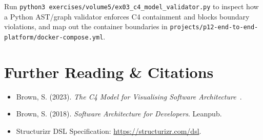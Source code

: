 \begin{labbridgebox}
Run \texttt{python3 exercises/volume5/ex03\_c4\_model\_validator.py} to inspect how a Python AST/graph validator enforces C4 containment and blocks boundary violations, and map out the container boundaries in \texttt{projects/p12-end-to-end-platform/docker-compose.yml}.
\end{labbridgebox}

\section{Further Reading \protect\& Citations}
\begin{itemize}[leftmargin=18pt]
  \item Brown, S. (2023). \textit{The C4 Model for Visualising Software Architecture}~\cite{c4model}.
  \item Brown, S. (2018). \textit{Software Architecture for Developers}. Leanpub.
  \item Structurizr DSL Specification: \url{https://structurizr.com/dsl}.
\end{itemize}
